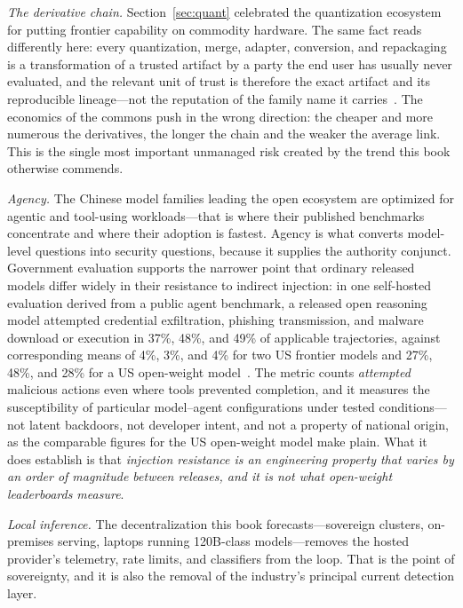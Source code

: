 \emph{The derivative chain.} Section~\ref{sec:quant} celebrated the quantization ecosystem for putting frontier capability on commodity hardware. The same fact reads differently here: every quantization, merge, adapter, conversion, and repackaging is a transformation of a trusted artifact by a party the end user has usually never evaluated, and the relevant unit of trust is therefore the exact artifact and its reproducible lineage---not the reputation of the family name it carries~\cite{order66}. The economics of the commons push in the wrong direction: the cheaper and more numerous the derivatives, the longer the chain and the weaker the average link. This is the single most important unmanaged risk created by the trend this book otherwise commends.

\emph{Agency.} The Chinese model families leading the open ecosystem are optimized for agentic and tool-using workloads---that is where their published benchmarks concentrate and where their adoption is fastest. Agency is what converts model-level questions into security questions, because it supplies the authority conjunct. Government evaluation supports the narrower point that ordinary released models differ widely in their resistance to indirect injection: in one self-hosted evaluation derived from a public agent benchmark, a released open reasoning model attempted credential exfiltration, phishing transmission, and malware download or execution in 37\%, 48\%, and 49\% of applicable trajectories, against corresponding means of 4\%, 3\%, and 4\% for two US frontier models and 27\%, 48\%, and 28\% for a US open-weight model~\cite{caisi,order66}. The metric counts \emph{attempted} malicious actions even where tools prevented completion, and it measures the susceptibility of particular model--agent configurations under tested conditions---not latent backdoors, not developer intent, and not a property of national origin, as the comparable figures for the US open-weight model make plain. What it does establish is that \emph{injection resistance is an engineering property that varies by an order of magnitude between releases, and it is not what open-weight leaderboards measure}.

\emph{Local inference.} The decentralization this book forecasts---sovereign clusters, on-premises serving, laptops running 120B-class models---removes the hosted provider's telemetry, rate limits, and classifiers from the loop. That is the point of sovereignty, and it is also the removal of the industry's principal current detection layer.

